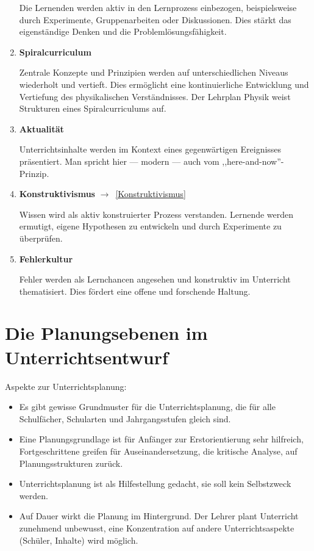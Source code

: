 \begin{enumerate}
	Die Lernenden werden aktiv in den Lernprozess einbezogen, beispielsweise durch Experimente, Gruppenarbeiten oder Diskussionen. Dies st\"{a}rkt das eigenst\"{a}ndige Denken und die Probleml\"{o}sungsf\"{a}higkeit.
	
	\item{\textbf{Spiralcurriculum}}
	
	Zentrale Konzepte und Prinzipien werden auf unterschiedlichen Niveaus wiederholt und vertieft. Dies erm\"{o}glicht eine kontinuierliche Entwicklung und Vertiefung des physikalischen Verst\"{a}ndnisses. Der Lehrplan Physik weist Strukturen eines Spiralcurriculums auf.
	
	\item{\textbf{Aktualit\"{a}t}}
	
	Unterrichtsinhalte werden im Kontext eines gegenw\"{a}rtigen
	Ereignisses pr\"{a}sentiert.
	\mip
	Man spricht hier --- modern --- auch vom ,,here-and-now''-Prinzip.
	
	\item{\textbf{Konstruktivismus}} $\to$~\cref{Konstruktivismus}
	
	Wissen wird als aktiv konstruierter Prozess verstanden. Lernende werden ermutigt, eigene Hypothesen zu entwickeln und durch Experimente zu \"{u}berpr\"{u}fen.
	
	\item{\textbf{Fehlerkultur}}
	
	Fehler werden als Lernchancen angesehen und konstruktiv im Unterricht thematisiert. Dies f\"{o}rdert eine offene und forschende Haltung.
	
\end{enumerate}

\bip\bip
\section{Die Planungsebenen im Unterrichtsentwurf}

Aspekte zur Unterrichtsplanung:
\begin{itemize}
	\item
	Es gibt gewisse Grundmuster für die Unterrichtsplanung, die f\"{u}r alle
	Schulf\"{a}cher, Schularten und Jahrgangsstufen gleich sind.
	\item
	Eine Planungsgrundlage ist f\"{u}r Anf\"{a}nger zur
	Erstorientierung sehr hilfreich,
	Fortgeschrittene greifen f\"{u}r Auseinandersetzung, die kritische
	Analyse, auf Planungsstrukturen zur\"{u}ck.
	\item
	Unterrichtsplanung ist als Hilfestellung gedacht, sie soll kein
	Selbstzweck werden.
	\item
	Auf Dauer wirkt die Planung im Hintergrund.
	Der Lehrer plant Unterricht zunehmend unbewusst, eine Konzentration
	auf andere Unterrichtsaspekte (Sch\"{u}ler, Inhalte) wird m\"{o}glich.
\end{itemize}

